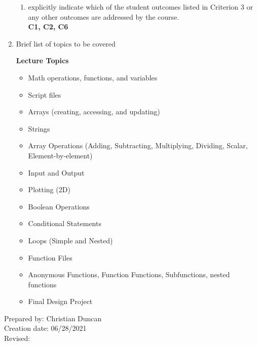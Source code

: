 \begin{enumerate}[1.]
\begin{enumerate}
\item explicitly indicate which of the student outcomes listed in Criterion 3 or any other outcomes are addressed by the course.\\
  {\bfseries
    C1,
    C2,
    C6
  }
\end{enumerate}

\item Brief list of topics to be covered\\
  {\bfseries
    Lecture Topics
    \begin{itemize}
      \item Math operations, functions, and variables
      \item Script files
      \item Arrays (creating, accessing, and updating)
      \item Strings
      \item Array Operations (Adding, Subtracting, Multiplying, Dividing, Scalar, Element-by-element)
      \item Input and Output
      \item Plotting (2D)
      \item Boolean Operations
      \item Conditional Statements
      \item Loops (Simple and Nested)
      \item Function Files
      \item Anonymous Functions, Function Functions, Subfunctions, nested functions
      \item Final Design Project
    \end{itemize}
  }

\end{enumerate}

\noindent Prepared by: Christian Duncan\\
\noindent Creation date: 06/28/2021\\
\noindent Revised:\\
